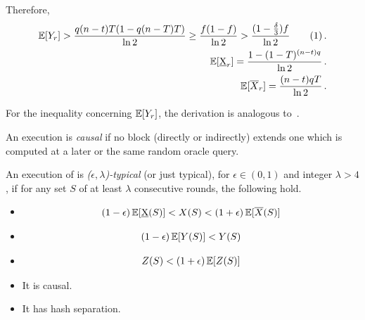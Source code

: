 Therefore,
\begin{align*}
  \E[Y_r] > \frac{q(n - t)T(1 - q(n - T)T)}{\ln2} \geq \frac{f(1 - f)}{\ln2} > \frac{(1 - \frac{\delta}{3})f}{\ln2} \stepcounter{equation}\tag{\theequation}\label{eq.ex-y-bound}\,.\\
  \E[\underbar{X}_r] = \frac{1 - (1 - T)^{(n - t)q}}{\ln2}\,.\\
  \E[\overline{X}_r] = \frac{(n - t)qT}{\ln2}\,.
\end{align*}

For the inequality concerning $\mathop{{}\mathbb{E}}[Y_r]$, the derivation is analogous to~\cite{backbone}.

\begin{definition}[Causality]
  An execution is \emph{causal} if no block (directly or indirectly) extends
  one which is computed at a later or the same random oracle query.
\end{definition}

\begin{definition}
  An execution of \poem is \emph{($\epsilon,\lambda$)-typical} (or just typical),
  for $\epsilon \in (0,1)$ and integer $\lambda > 4$, if for any set $S$ of at
  least $\lambda$ consecutive rounds, the following hold.
  \begin{itemize}
    \item
    \begin{minipage}{\linewidth}%
      \vspace{-\abovedisplayskip}%
      \begin{align}%
        (1 - \epsilon) \E[\underbar{X}(S)] < X(S) < (1 + \epsilon) \E[\overline{X}(S)] \label{eq.typical-x}%
      \end{align}%
    \end{minipage}

    \item
    \begin{minipage}{\linewidth}%
      \vspace{-\abovedisplayskip}%
      \begin{align}%
        (1 - \epsilon) \E[Y(S)] < Y(S) \label{eq.typical-y}%
      \end{align}%
    \end{minipage}

    \item
    \begin{minipage}{\linewidth}%
      \vspace{-\abovedisplayskip}%
      \begin{align}%
        Z(S) < (1 + \epsilon)\E[Z(S)] \label{eq.typical-z}%
      \end{align}%
    \end{minipage}

    \item It is causal.
    \item It has hash separation.
  \end{itemize}
\end{definition}

